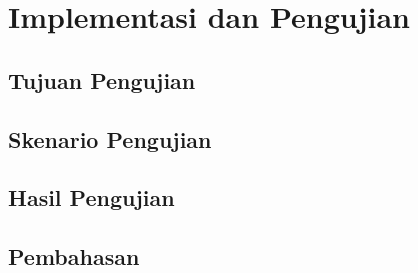 \chapter{Implementasi dan Pengujian}

\section{Tujuan Pengujian}
\blindtext

\section{Skenario Pengujian}
\blindtext

\section{Hasil Pengujian}
\blindtext

\section{Pembahasan}
\blindtext